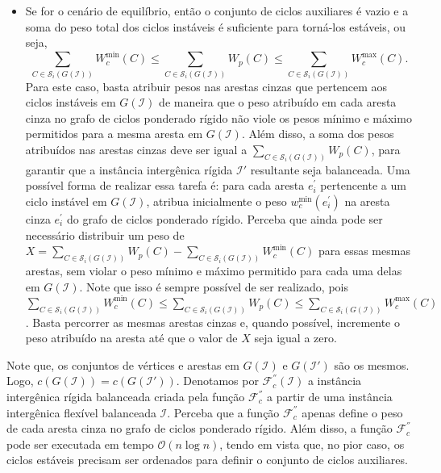 \begin{itemize}
\begin{itemize}
    \item Se for o cenário de equilíbrio, então o conjunto de ciclos auxiliares é vazio e a soma do peso total dos ciclos instáveis é suficiente para torná-los estáveis, ou seja, $$\sum_{C \in \mathcal{S}_i(G(\mathcal{I}))} W^{\min}_c(C) \le \sum_{C \in \mathcal{S}_i(G(\mathcal{I}))} W_p(C) \le \sum_{C \in \mathcal{S}_i(G(\mathcal{I}))} W^{\max}_c(C).$$ Para este caso, basta atribuir pesos nas arestas cinzas que pertencem aos ciclos instáveis em $G(\mathcal{I})$ de maneira que o peso atribuído em cada aresta cinza no grafo de ciclos ponderado rígido não viole os pesos mínimo e máximo permitidos para a mesma aresta em $G(\mathcal{I})$. Além disso, a soma dos pesos atribuídos nas arestas cinzas deve ser igual a $\sum_{C \in \mathcal{S}_i(G(\mathcal{I}))} W_p(C)$, para garantir que a instância intergênica rígida $\mathcal{I}'$ resultante seja balanceada. Uma possível forma de realizar essa tarefa é: para cada aresta $e^{\prime}_i$ pertencente a um ciclo instável em $G(\mathcal{I})$, atribua inicialmente o peso $w^{\min}_c(e^{\prime}_i)$ na aresta cinza $e^{\prime}_i$ do grafo de ciclos ponderado rígido. Perceba que ainda pode ser necessário distribuir um peso de $X = \sum_{C \in \mathcal{S}_i(G(\mathcal{I}))} W_p(C) - \sum_{C \in \mathcal{S}_i(G(\mathcal{I}))} W^{\min}_c(C)$ para essas mesmas arestas, sem violar o peso mínimo e máximo permitido para cada uma delas em $G(\mathcal{I})$. Note que isso é sempre possível de ser realizado, pois $\sum_{C \in \mathcal{S}_i(G(\mathcal{I}))} W^{\min}_c(C) \le \sum_{C \in \mathcal{S}_i(G(\mathcal{I}))} W_p(C) \le \sum_{C \in \mathcal{S}_i(G(\mathcal{I}))} W^{\max}_c(C)$. Basta percorrer as mesmas arestas cinzas e, quando possível, incremente o peso atribuído na aresta até que o valor de $X$ seja igual a zero.
  \end{itemize}
\end{itemize}

Note que, os conjuntos de vértices e arestas em $G(\mathcal{I})$ e $G(\mathcal{I}')$ são os mesmos. Logo, $c(G(\mathcal{I})) = c(G(\mathcal{I}'))$. Denotamos por $\mathcal{F}_{c}^{''}(\mathcal{I})$ a instância intergênica rígida balanceada criada pela função $\mathcal{F}_{c}^{''}$ a partir de uma instância intergênica flexível balanceada $\mathcal{I}$. Perceba que a função $\mathcal{F}_{c}^{''}$ apenas define o peso de cada aresta cinza no grafo de ciclos ponderado rígido. Além disso, a função $\mathcal{F}_{c}^{''}$ pode ser executada em tempo $\mathcal{O}(n \log n)$, tendo em vista que, no pior caso, os ciclos estáveis precisam ser ordenados para definir o conjunto de ciclos auxiliares.

